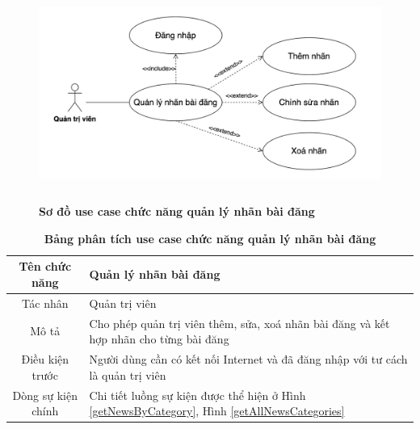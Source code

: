   \begin{figure}[H]
    \centering
    \includegraphics[width=15cm,height=7cm]{Images/use_case/use_case_category_news.png}
    \caption[Sơ đồ use case chức năng quản lý nhãn bài đăng]{\bfseries \fontsize{12pt}{0pt}
    \selectfont Sơ đồ use case chức năng quản lý nhãn bài đăng}
    \label{use_case_category_news} %
  \end{figure}

  \begin{table}[H]
    \caption{\bfseries \fontsize{12pt}{0pt}\selectfont Bảng phân tích use case chức năng quản lý nhãn bài đăng}
    \centering
    \begin{tabularx}{0.9\textwidth}{|c|X|}
      \hline
      \textbf{Tên chức năng} & \textbf{Quản lý nhãn bài đăng} \\
      \hline
      Tác nhân & Quản trị viên \\
      \hline
      Mô tả & Cho phép quản trị viên thêm, sửa, xoá nhãn bài đăng và kết hợp nhãn cho từng bài đăng \\
      \hline
      Điều kiện trước & Người dùng cần có kết nối Internet và đã đăng nhập với tư cách là quản trị viên \\
      \hline
      Dòng sự kiện chính & 
        Chi tiết luồng sự kiện được thể hiện ở Hình \ref{getNewsByCategory}, Hình \ref{getAllNewsCategories}\\
      \hline
    \end{tabularx}
  \end{table}

